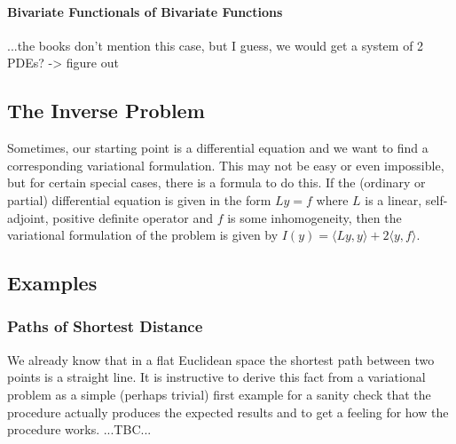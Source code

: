 
\paragraph{Bivariate Functionals of Bivariate Functions} ...the books don't mention this case, but I guess, we would get a system of 2 PDEs? -> figure out





\subsection{The Inverse Problem}
Sometimes, our starting point is a differential equation and we want to find a corresponding variational formulation. This may not be easy or even impossible, but for certain special cases, there is a formula to do this. If the (ordinary or partial) differential equation is given in the form $L y = f$ where $L$ is a linear, self-adjoint, positive definite operator and $f$ is some inhomogeneity, then the variational formulation of the problem is given by $I(y) = \langle L y, y \rangle + 2 \langle y, f \rangle $.


\subsection{Examples}

\subsubsection{Paths of Shortest Distance}
We already know that in a flat Euclidean space the shortest path between two points is a straight line. It is instructive to derive this fact from a variational problem as a simple (perhaps trivial) first example for a sanity check that the procedure actually produces the expected results and to get a feeling for how the procedure works. ...TBC...

